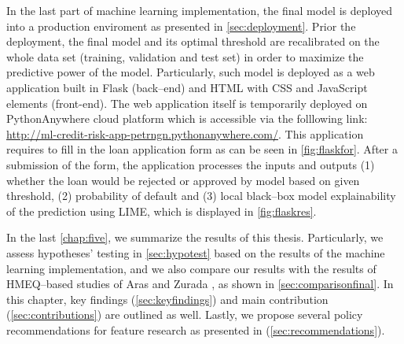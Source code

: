 In the last part of machine learning implementation, the final model is deployed into a production enviroment as presented in \autoref{sec:deployment}.
Prior the deployment, the final model and its optimal threshold are recalibrated on the whole data set (training, validation and test set) in order to maximize the predictive power of the model.
Particularly, such model is deployed as a web application built in Flask (back--end) and HTML with CSS and JavaScript elements (front-end).
The web application itself is temporarily deployed on PythonAnywhere cloud platform which is accessible via the folllowing link: \url{http://ml-credit-risk-app-petrngn.pythonanywhere.com/}.
This application requires to fill in the loan application form  as can be seen in \autoref{fig:flaskfor}.
After a submission of the form, the application processes the inputs and outputs (1) whether the loan would be rejected or approved by model based on given threshold, (2) probability of default and (3) local black--box model explainability of the prediction using LIME, which is displayed in \autoref{fig:flaskres}.


In the last \autoref{chap:five}, we summarize the results of this thesis. Particularly, we assess hypotheses' testing in \autoref{sec:hypotest} based on the results of the machine learning implementation, and we also compare our results with the results of HMEQ--based studies of Aras \citep{serkan2021bagging} and Zurada \citep{zurada2014classification}, as shown in \autoref{sec:comparisonfinal}.
In this chapter, key findings (\autoref{sec:keyfindings}) and main contribution (\autoref{sec:contributions}) are outlined as well.
Lastly, we propose several policy recommendations for feature research as presented in (\autoref{sec:recommendations}).